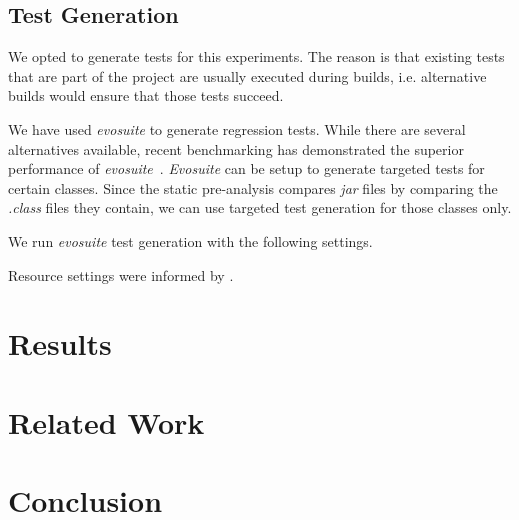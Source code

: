 \documentclass[conference]{IEEEtran}
\begin{document}
\subsection{Test Generation}

We opted to generate tests for this experiments. The reason is that existing tests that are part of the project are usually executed during builds, i.e. alternative builds would ensure that those tests succeed. 


We have used \textit{evosuite} to generate regression tests. While there are several alternatives available, recent benchmarking has demonstrated the superior performance of \textit{evosuite}~\cite{jahangirova2023sbft}. \textit{Evosuite} can be setup to generate targeted tests for certain classes. Since the static pre-analysis compares \textit{jar} files by comparing the \textit{.class} files they contain, we can use targeted test generation for those classes only.   


We run \textit{evosuite} test generation with the following settings. 



Resource settings were informed by \cite{jahangirova2023sbft}. 



\section{Results}


\section{Related Work}


\section{Conclusion}











\end{document}
